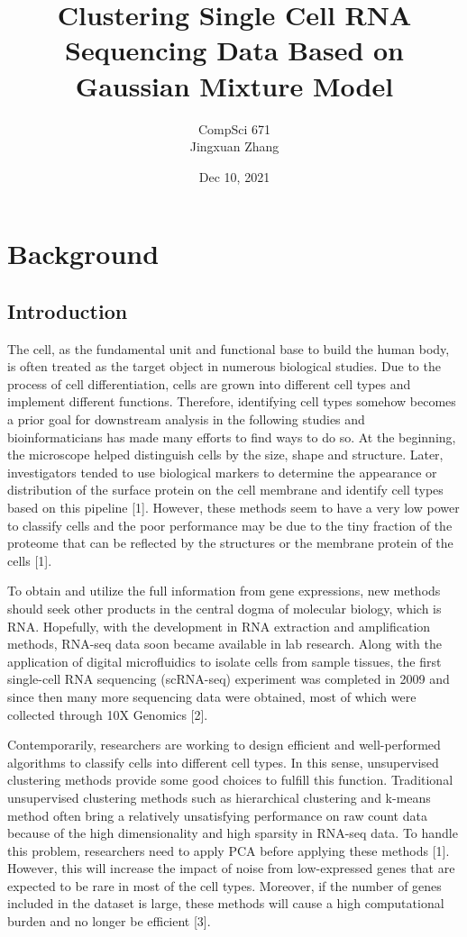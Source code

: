 \documentclass[12pt]{article}
\title{Clustering Single Cell RNA Sequencing Data Based on Gaussian Mixture Model}
\author{CompSci 671\\
Jingxuan Zhang}
\date{Dec 10, 2021}
\theoremstyle{definition}
\begin{document}
\maketitle

\section{Background}
\subsection{Introduction}

The cell, as the fundamental unit and functional base to build the human body, is often treated as the target object in numerous biological studies. Due to the process of cell differentiation, cells are grown into different cell types and implement different functions. Therefore, identifying cell types somehow becomes a prior goal for downstream analysis in the following studies and bioinformaticians has made many efforts to find ways to do so. At the beginning, the microscope helped distinguish cells by the size, shape and structure. Later, investigators tended to use biological markers to determine the appearance or distribution of the surface protein on the cell membrane and identify cell types based on this pipeline [1]. However, these methods seem to have a very low power to classify cells and the poor performance may be due to the tiny fraction of the proteome that can be reflected by the structures or the membrane protein of the cells [1].

To obtain and utilize the full information from gene expressions, new methods should seek other products in the central dogma of molecular biology, which is RNA. Hopefully, with the development in RNA extraction and amplification methods, RNA-seq data soon became available in lab research. Along with the application of digital microfluidics to isolate cells from sample tissues, the first single-cell RNA sequencing (scRNA-seq) experiment was completed in 2009 and since then many more sequencing data were obtained, most of which were collected through 10X Genomics [2].

Contemporarily, researchers are working to design efficient and well-performed algorithms to classify cells into different cell types. In this sense, unsupervised clustering methods provide some good choices to fulfill this function. Traditional unsupervised clustering methods such as hierarchical clustering and k-means method often bring a relatively unsatisfying performance on raw count data because of the high dimensionality and high sparsity in RNA-seq data. To handle this problem, researchers need to apply PCA before applying these methods [1]. However, this will increase the impact of noise from low-expressed genes that are expected to be rare in most of the cell types. Moreover, if the number of genes included in the dataset is large, these methods will cause a high computational burden and no longer be efficient [3].
\end{document}
